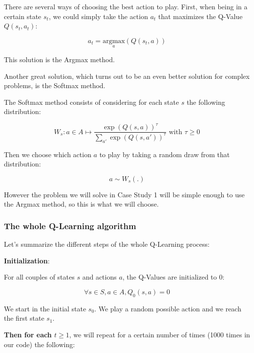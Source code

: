 \documentclass[]{book}
\begin{document}
There are several ways of choosing the best action to play. First, when being in a certain state \(s_t\), we could simply take the action \(a_t\) that maximizes the Q-Value \(Q(s_t,a_t)\):

\begin{equation*}
a_t = \underset{a}{\textrm{argmax}}(Q(s_t,a))
\end{equation*}

This solution is the Argmax method.

Another great solution, which turns out to be an even better solution for complex problems, is the Softmax method.

The Softmax method consists of considering for each state \(s\) the following distribution:

\begin{equation*}
W_s: a \in A \mapsto \frac{\exp(Q(s,a))^{\tau}}{\sum_{a'}\exp(Q(s,a'))^{\tau}} \textrm{ with } \tau \ge 0
\end{equation*}

Then we choose which action \(a\) to play by taking a random draw from that distribution:

\begin{equation*}
a \sim W_s(.)
\end{equation*}

However the problem we will solve in Case Study 1 will be simple enough to use the Argmax method, so this is what we will choose.

\subsubsection{The whole Q-Learning algorithm}

Let's summarize the different steps of the whole Q-Learning process:

\textbf{Initialization}:

For all couples of states \(s\) and actions \(a\), the Q-Values are initialized to 0:

\begin{equation*}
\forall s \in S, a \in A, Q_0(s,a) = 0
\end{equation*}

We start in the initial state \(s_0\). We play a random possible action and we reach the first state \(s_1\).

\textbf{Then for each $t \ge 1$}, we will repeat for a certain number of times (1000 times in our code) the following:
\end{document}

